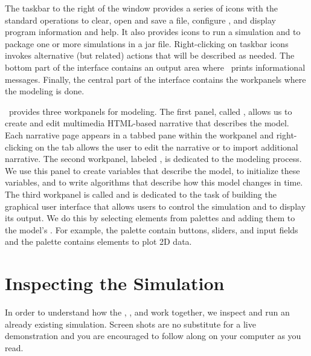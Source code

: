 The taskbar to the right of the window provides a series of icons with the standard operations to
clear, open and save a file, configure \ejs, and display program information and help. It also provides icons to run a
simulation and to package one or more simulations in a jar file.  Right-clicking on taskbar icons invokes alternative (but related) actions that will be described as needed. The bottom part of the interface contains an output area where \ejs\ prints informational messages. Finally, the central part of the interface contains the workpanels where the modeling is done.

\Ejs\ provides three workpanels for modeling. The first panel, called , allows us to create and edit multimedia HTML-based narrative that describes the model.  Each narrative page appears in a tabbed pane within the
workpanel and right-clicking on the tab allows the user to edit the narrative or to import additional narrative. The second workpanel, labeled , is dedicated to the modeling process. We use this panel to create variables that describe the model, to initialize these variables, and to write algorithms that describe how this model changes in time. The third workpanel is called  and is dedicated to the task of building the graphical user interface that allows users to control the simulation and to display its output. We do this by selecting elements from palettes and adding them to the model's . For example, the  palette contain buttons, sliders, and input fields and the  palette contains elements to plot 2D data.

    \section{Inspecting the Simulation}\label{section:02Inspecting}
In order to understand how the , , and  work together, we inspect and run an
already existing simulation. Screen shots are no substitute for a live demonstration and you are encouraged to follow along on your computer as you read.

